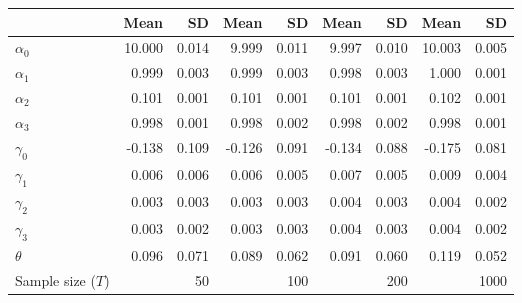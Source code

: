 
\begin{tabular}[t]{lrrrrrrrr}
\toprule
  & Mean & SD & Mean  & SD  & Mean   & SD   & Mean    & SD   \\
\midrule
$\alpha_{0}$ & 10.000 & 0.014 & 9.999 & 0.011 & 9.997 & 0.010 & 10.003 & 0.005\\
$\alpha_{1}$ & 0.999 & 0.003 & 0.999 & 0.003 & 0.998 & 0.003 & 1.000 & 0.001\\
$\alpha_{2}$ & 0.101 & 0.001 & 0.101 & 0.001 & 0.101 & 0.001 & 0.102 & 0.001\\
$\alpha_{3}$ & 0.998 & 0.001 & 0.998 & 0.002 & 0.998 & 0.002 & 0.998 & 0.001\\
$\gamma_{0}$ & -0.138 & 0.109 & -0.126 & 0.091 & -0.134 & 0.088 & -0.175 & 0.081\\
$\gamma_{1}$ & 0.006 & 0.006 & 0.006 & 0.005 & 0.007 & 0.005 & 0.009 & 0.004\\
$\gamma_{2}$ & 0.003 & 0.003 & 0.003 & 0.003 & 0.004 & 0.003 & 0.004 & 0.002\\
$\gamma_{3}$ & 0.003 & 0.002 & 0.003 & 0.003 & 0.004 & 0.003 & 0.004 & 0.002\\
$\theta$ & 0.096 & 0.071 & 0.089 & 0.062 & 0.091 & 0.060 & 0.119 & 0.052\\
Sample size ($T$) &  & 50 &  & 100 &  & 200 &  & 1000\\
\bottomrule
\end{tabular}
